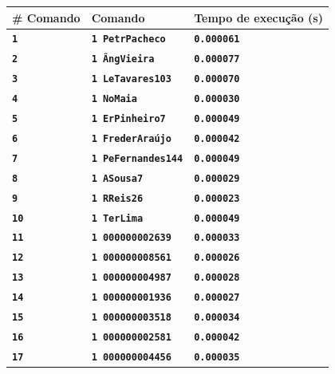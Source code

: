 \documentclass[12pt,a4paper]{report}
\begin{document}
\begin{tabularx}{\textwidth} { 
  | >{\centering\arraybackslash}X 
  | >{\centering\arraybackslash}X 
  | >{\centering\arraybackslash}X | }
 \hline
 \textbf{\# Comando} & \textbf{Comando} & \textbf{Tempo de execução (s)} \\
 \hline
 \texttt{\textbf{1}} & \texttt{\textbf{1 PetrPacheco}}  & \texttt{\textbf{0.000061}}  \\
 \hline
 \texttt{\textbf{2}} & \texttt{\textbf{1 ÂngVieira}}  & \texttt{\textbf{0.000077}}  \\
 \hline
 \texttt{\textbf{3}} & \texttt{\textbf{1 LeTavares103}}  & \texttt{\textbf{0.000070}}  \\
 \hline
 \texttt{\textbf{4}} & \texttt{\textbf{1 NoMaia}}  & \texttt{\textbf{0.000030}}  \\
 \hline
 \texttt{\textbf{5}} & \texttt{\textbf{1 ErPinheiro7}}  & \texttt{\textbf{0.000049}}  \\
 \hline
 \texttt{\textbf{6}} & \texttt{\textbf{1 FrederAraújo}}  & \texttt{\textbf{0.000042}}  \\
 \hline
 \texttt{\textbf{7}} & \texttt{\textbf{1 PeFernandes144}}  & \texttt{\textbf{0.000049}}  \\
 \hline
 \texttt{\textbf{8}} & \texttt{\textbf{1 ASousa7}}  & \texttt{\textbf{0.000029}}  \\
 \hline
 \texttt{\textbf{9}} & \texttt{\textbf{1 RReis26}}  & \texttt{\textbf{0.000023}}  \\
 \hline
 \texttt{\textbf{10}} & \texttt{\textbf{1 TerLima}}  & \texttt{\textbf{0.000049}}  \\
 \hline
 \texttt{\textbf{11}} & \texttt{\textbf{1 000000002639}}  & \texttt{\textbf{0.000033}}  \\
 \hline
 \texttt{\textbf{12}} & \texttt{\textbf{1 000000008561}}  & \texttt{\textbf{0.000026}}  \\
 \hline
 \texttt{\textbf{13}} & \texttt{\textbf{1 000000004987}}  & \texttt{\textbf{0.000028}}  \\
 \hline
 \texttt{\textbf{14}} & \texttt{\textbf{1 000000001936}}  & \texttt{\textbf{0.000027}}  \\
 \hline
 \texttt{\textbf{15}} & \texttt{\textbf{1 000000003518}}  & \texttt{\textbf{0.000034}}  \\
 \hline
 \texttt{\textbf{16}} & \texttt{\textbf{1 000000002581}}  & \texttt{\textbf{0.000042}}  \\
 \hline
 \texttt{\textbf{17}} & \texttt{\textbf{1 000000004456}}  & \texttt{\textbf{0.000035}}  \\

\end{tabularx}
\end{document}
